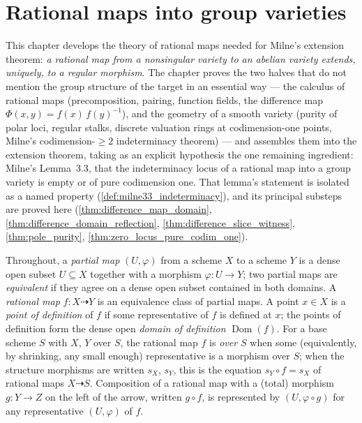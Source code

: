 \chapter{Rational maps into group varieties}
\label{chap:Albanese}

This chapter develops the theory of rational maps needed for Milne's extension
theorem: \emph{a rational map from a nonsingular variety to an abelian variety
extends, uniquely, to a regular morphism}. The chapter proves the two halves that
do not mention the group structure of the target in an essential way --- the
calculus of rational maps (precomposition, pairing, function fields, the
difference map \(\Phi(x,y) = f(x)\,f(y)^{-1}\)), and the geometry of a smooth
variety (purity of polar loci, regular stalks, discrete valuation rings at
codimension-one points, Milne's codimension-\(\geq 2\) indeterminacy theorem) ---
and assembles them into the extension theorem, taking as an explicit hypothesis
the one remaining ingredient: Milne's Lemma~3.3, that the indeterminacy locus of
a rational map into a group variety is empty or of pure codimension one. That
lemma's statement is isolated as a named property
(\ref{def:milne33_indeterminacy}), and its principal substeps are proved here
(\ref{thm:difference_map_domain}, \ref{thm:difference_domain_reflection},
\ref{thm:difference_slice_witness}, \ref{thm:pole_purity},
\ref{thm:zero_locus_pure_codim_one}).

Throughout, a \emph{partial map} \((U, \varphi)\) from a scheme \(X\) to a scheme
\(Y\) is a dense open subset \(U \subseteq X\) together with a morphism
\(\varphi : U \to Y\); two partial maps are \emph{equivalent} if they agree on a
dense open subset contained in both domains. A \emph{rational map}
\(f : X \dashrightarrow Y\) is an equivalence class of partial maps. A point
\(x \in X\) is a \emph{point of definition} of \(f\) if some representative of
\(f\) is defined at \(x\); the points of definition form the dense open
\emph{domain of definition} \(\operatorname{Dom}(f)\). For a base scheme \(S\)
with \(X\), \(Y\) over \(S\), the rational map \(f\) is \emph{over \(S\)} when
some (equivalently, by shrinking, any small enough) representative is a morphism
over \(S\); when the structure morphisms are written \(s_X\), \(s_Y\), this is
the equation \(s_Y \circ f = s_X\) of rational maps \(X \dashrightarrow S\).
Composition of a rational map with a (total) morphism \(g : Y \to Z\) on the
left of the arrow, written \(g \circ f\), is represented by \((U, \varphi
\circ g)\) for any representative \((U, \varphi)\) of \(f\).

